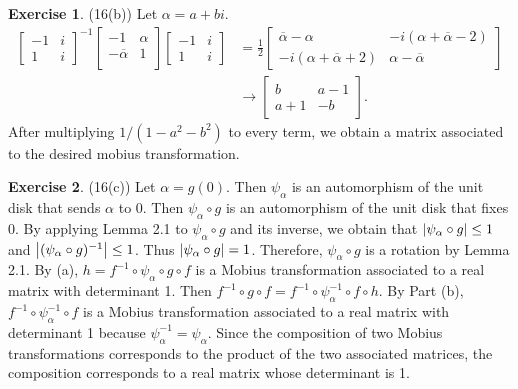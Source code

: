 \documentclass[12pt, psamsfonts]{amsart}
\theoremstyle{definition}
\newtheorem*{exer}{Exercise}
\theoremstyle{remark}
\numberwithin{equation}{section}
\begin{document}
\begin{exer}{(16(b))}
  Let $\alpha = a + bi$.
  \begin{align*}
    \begin{bmatrix}
      -1 & i \\
      1 & i
    \end{bmatrix}^{-1}
    \begin{bmatrix}
      -1 & \alpha \\
      -\overline{\alpha} & 1 \\
    \end{bmatrix}
    \begin{bmatrix}
      -1 & i \\
      1 & i
    \end{bmatrix}
    &= \frac{1}{2} \begin{bmatrix} \overline{\alpha} - \alpha & -i(\alpha + \overline{\alpha} - 2) \\ -i(\alpha + \overline{\alpha} + 2) & \alpha - \overline{\alpha} \end{bmatrix} \\ 
    &\rightarrow \begin{bmatrix} b & a - 1 \\ a + 1 & -b \end{bmatrix}.
  \end{align*}
  After multiplying $1 / (1 - a^2 - b^2)$ to every term, we obtain a matrix associated to the desired mobius transformation.
\end{exer}

\begin{exer}{(16(c))}
  Let $\alpha = g(0)$.
  Then $\psi_{\alpha}$ is an automorphism of the unit disk that sends $\alpha$ to 0.
  Then $\psi_{\alpha} \circ g$ is an automorphism of the unit disk that fixes 0.
  By applying Lemma 2.1 to $\psi_{\alpha} \circ g$ and its inverse, we obtain that $\abs{\psi_{\alpha} \circ g} \leq 1$ and $\abs{(\psi_{\alpha} \circ g)^{-1}} \leq 1$.
  Thus $\abs{\psi_{\alpha} \circ g} = 1$.
  Therefore, $\psi_{\alpha} \circ g$ is a rotation by Lemma 2.1.
  By (a), $h = f^{-1} \circ \psi_{\alpha} \circ g \circ f$ is a Mobius transformation associated to a real matrix with determinant 1.
  Then $f^{-1} \circ g \circ f = f^{-1} \circ \psi_{\alpha}^{-1} \circ f \circ h$.
  By Part (b), $f^{-1} \circ \psi_{\alpha}^{-1} \circ f$ is a Mobius transformation associated to a real matrix with determinant 1 because $\psi_{\alpha}^{-1} = \psi_{\alpha}$.
  Since the composition of two Mobius transformations corresponds to the product of the two associated matrices, the composition corresponds to a real matrix whose determinant is 1.
\end{exer}
\end{document}
